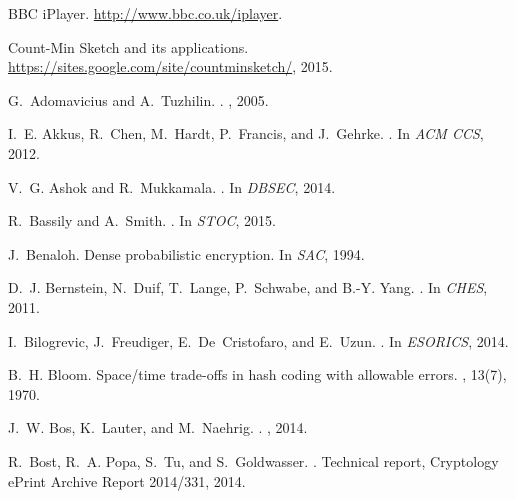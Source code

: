 \documentclass[conference]{IEEEtran}
\begin{document}
\begin{thebibliography}{10}

{BBC iPlayer}.
\newblock \url{http://www.bbc.co.uk/iplayer}.

{Count-Min Sketch and its applications}.
\newblock \url{https://sites.google.com/site/countminsketch/}, 2015.

G.~Adomavicius and A.~Tuzhilin.
.
, 2005.

I.~E. Akkus, R.~Chen, M.~Hardt, P.~Francis, and J.~Gehrke.
.
\newblock In {\em ACM CCS}, 2012.

V.~G. Ashok and R.~Mukkamala.
.
\newblock In {\em DBSEC}, 2014.

R.~Bassily and A.~Smith.
.
\newblock In {\em STOC}, 2015.

J.~Benaloh.
\newblock Dense probabilistic encryption.
\newblock In {\em SAC}, 1994.

D.~J. Bernstein, N.~Duif, T.~Lange, P.~Schwabe, and B.-Y. Yang.
.
\newblock In {\em CHES}, 2011.

I.~Bilogrevic, J.~Freudiger, E.~De~Cristofaro, and E.~Uzun.
.
\newblock In {\em ESORICS}, 2014.

B.~H. Bloom.
\newblock Space/time trade-offs in hash coding with allowable errors.
, 13(7), 1970.

J.~W. Bos, K.~Lauter, and M.~Naehrig.
.
, 2014.

R.~Bost, R.~A. Popa, S.~Tu, and S.~Goldwasser.
.
\newblock Technical report, Cryptology ePrint Archive Report 2014/331, 2014.


\end{thebibliography}
\end{document}
